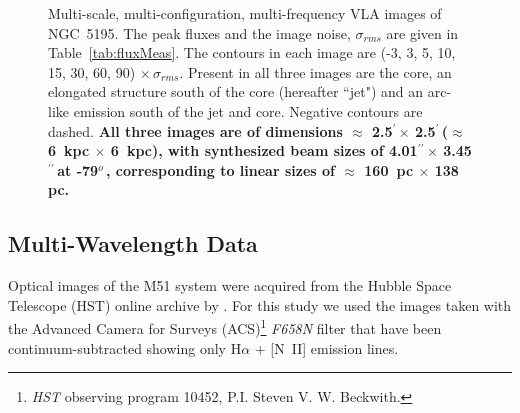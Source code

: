 \documentclass[fleqn,usenatbib]{mnras}
\def\tab{Table}
\def\deg{$^{o}\,$}
\def\arcm{$^{\prime}\,$}
\def\arcs{$^{\prime\prime}\,$}
\begin{document}
\begin{figure}
\caption{Multi-scale, multi-configuration, multi-frequency VLA images of NGC~5195. The peak fluxes and the image noise, $\sigma_{rms}$ are given in \tab~\ref{tab:fluxMeas}. The contours in each image are (-3, 3, 5, 10, 15, 30, 60, 90) $\times\, \sigma_{rms}$. Present in all three images are the core, an elongated structure south of the core (hereafter ``jet") and an arc-like emission south of the jet and core. Negative contours are dashed. \textbf{All three images are of dimensions $\approx$ 2.5\arcm $\times$ 2.5\arcm ($\approx$ 6~kpc $\times$ 6~kpc), with synthesized beam sizes of 4.01\arcs $\times$ 3.45\arcs at -79\deg, corresponding to linear sizes of $\approx$ 160~pc $\times$ 138 pc.}}
\label{fig:VLAMaps}
\end{figure}


\subsection{Multi-Wavelength Data}

Optical images of the M51 system were acquired from the Hubble Space Telescope (HST) online archive by \cite{Rampadarathetal15}. For this study we used the images taken with the Advanced Camera for Surveys (ACS)\footnote{\textit{HST} observing program 10452, P.I. Steven V. W. Beckwith.} \textit{F658N} filter that have been continuum-subtracted showing only H$\alpha$ + [N~II] emission lines.
\end{document}
